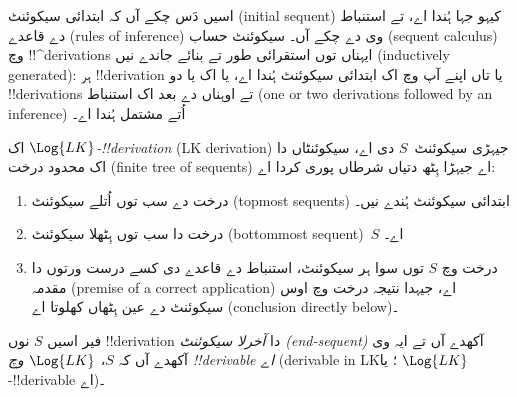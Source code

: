 \documentclass[../../../include/open-logic-section]{subfiles}
\begin{document}
      {}
      {}


\begin{explain}
اسیں دَس چکے آں کہ ابتدائی سیکوئنٹ (initial sequent) کیہو جہا ہُندا اے، تے استنباط دے
قاعدے (rules of inference) وی دے چکے آں۔ سیکوئنٹ حساب (sequent calculus) وچ !!^{derivation}s ایہناں توں
استقرائی طور تے بنائے جاندے نیں (inductively generated): ہر !!{derivation} یا تاں اپنے آپ وچ
اک ابتدائی سیکوئنٹ ہُندا اے، یا اک یا دو !!{derivation}s تے اوہناں دے
بعد اک استنباط (one or two derivations followed by an inference) اُتے مشتمل ہُندا اے۔
\end{explain}

\begin{defn}
اک \emph{$\Log{LK}$-!!{derivation}} (LK derivation) جیہڑی سیکوئنٹ~$S$ دی اے،
سیکوئنٹاں دا اک محدود درخت (finite tree of sequents) اے جیہڑا ہِٹھ دتیاں شرطاں پوری کردا اے:
\begin{enumerate}
\item درخت دے سب توں اُتلے سیکوئنٹ (topmost sequents) ابتدائی سیکوئنٹ ہُندے نیں۔
\item درخت دا سب توں ہِٹھلا سیکوئنٹ (bottommost sequent)~$S$ اے۔
\item درخت وچ $S$ توں سوا ہر سیکوئنٹ، استنباط دے قاعدے دی کسے درست
  ورتوں دا مقدمہ (premise of a correct application) اے، جیہدا نتیجہ درخت وچ اوس سیکوئنٹ دے عین ہِٹھاں
  کھلوتا اے (conclusion directly below)۔
\end{enumerate}
فیر اسیں $S$ نوں !!{derivation} دا \emph{آخرلا سیکوئنٹ (end-sequent)} آکھدے آں تے
ایہ وی آکھدے آں کہ $S$، \emph{$\Log{LK}$ وچ !!{derivable} اے} (derivable in LK؛ یا
$\Log{LK}$-!!{derivable} اے)۔
\end{defn}
\end{document}

